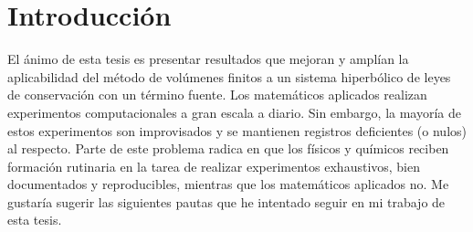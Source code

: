 \chapter*{Introducción}

El ánimo de esta tesis es presentar resultados que mejoran y amplían
la aplicabilidad del método de volúmenes finitos a un sistema
hiperbólico de leyes de conservación con un término fuente.
Los matemáticos aplicados realizan experimentos computacionales a
gran escala a diario.
Sin embargo, la mayoría de estos experimentos son improvisados y se
mantienen registros deficientes (o nulos) al respecto.
Parte de este problema radica en que los físicos y químicos reciben
formación rutinaria en la tarea de realizar experimentos exhaustivos,
bien documentados y reproducibles, mientras que los matemáticos
aplicados no.
Me gustaría sugerir las siguientes pautas que he intentado seguir en
mi trabajo de esta tesis.
